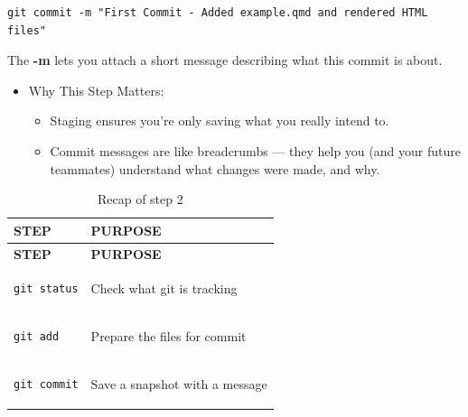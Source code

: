 \documentclass[
  11pt,
  a4paper,
]{article}
\begin{document}
\begin{verbatim}
git commit -m "First Commit - Added example.qmd and rendered HTML files"
\end{verbatim}

The \textbf{-m} lets you attach a short message describing what this
commit is about.

\begin{itemize}
\item
  Why This Step Matters:

  \begin{itemize}
  \item
    Staging ensures you're only saving what you really intend to.
  \item
    Commit messages are like breadcrumbs --- they help you (and your
    future teammates) understand what changes were made, and why.
  \end{itemize}
\end{itemize}

\begin{longtable}[]{@{}
  >{\raggedright\arraybackslash}p{}
  >{\raggedright\arraybackslash}p{}@{}}
\caption{Recap of step 2}\tabularnewline
\toprule\noalign{}
\begin{minipage}[b]{\linewidth}\raggedright
\textbf{STEP}
\end{minipage} & \begin{minipage}[b]{\linewidth}\raggedright
\textbf{PURPOSE}
\end{minipage} \\
\midrule\noalign{}
\endfirsthead
\toprule\noalign{}
\begin{minipage}[b]{\linewidth}\raggedright
\textbf{STEP}
\end{minipage} & \begin{minipage}[b]{\linewidth}\raggedright
\textbf{PURPOSE}
\end{minipage} \\
\midrule\noalign{}
\endhead
\bottomrule\noalign{}
\endlastfoot
\begin{minipage}[t]{\linewidth}\raggedright
\begin{verbatim}
git status
\end{verbatim}
\end{minipage} & Check what git is tracking \\
\begin{minipage}[t]{\linewidth}\raggedright
\begin{verbatim}
git add
\end{verbatim}
\end{minipage} & Prepare the files for commit \\
\begin{minipage}[t]{\linewidth}\raggedright
\begin{verbatim}
git commit
\end{verbatim}
\end{minipage} & Save a snapshot with a message \\
\end{longtable}
\end{document}
